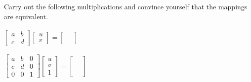 \documentclass[../gatm_answers.tex]{subfiles}
\begin{document}
\begin{inner_problem}
\item {}
\end{inner_problem}

\begin{inner_problem}
\item {}
\end{inner_problem}

\begin{inner_problem}
\item {}
\end{inner_problem}

\begin{outer_problem}
\item Carry out the following multiplications and convince yourself that the mappings are equivalent.
\end{outer_problem}

\begin{inner_problem}[start=1]
\item $\left[\begin{array}{cc}a & b \\ c & d\end{array}\right]\left[\begin{array}{c} u \\ v \end{array}\right]=\left[\begin{array}{c} \phantom{u} \\ \phantom{v} \end{array}\right]$ $\phantom{\begin{array}{c}u \\ v \\ 1 \end{array}}$
\end{inner_problem}

\begin{inner_problem}
\item $\left[\begin{array}{ccc}a & b & 0 \\ c & d & 0 \\ 0 & 0 & 1 \end{array}\right]\left[\begin{array}{c}u \\ v \\ 1 \end{array}\right] = \left[\begin{array}{c}\phantom{u} \\ \phantom{v} \\ \phantom{1} \end{array}\right]$
\end{inner_problem}
\end{document}
